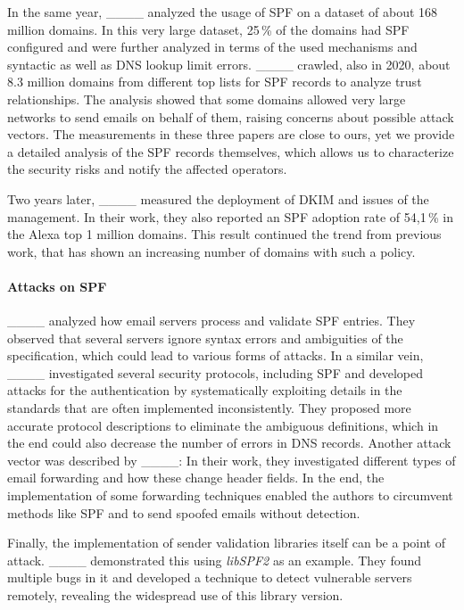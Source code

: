 In the same year, \mbox{____} analyzed the usage of \ac{SPF} on a dataset of about 168 million domains. In this very large dataset, 25\,\% of the domains had \ac{SPF} configured and were further analyzed in terms of the used mechanisms and syntactic as well as DNS lookup limit errors.
____ crawled, also in 2020, about 8.3 million domains from different top lists for SPF records to analyze trust relationships.
The analysis showed that some domains allowed very large networks to send emails on behalf of them, raising concerns about possible attack vectors.
The measurements in these three papers are close to ours, yet we provide a detailed analysis of the \ac{SPF} records themselves, which allows us to characterize the security risks and notify the affected operators.

Two years later, ____ measured the deployment of \ac{DKIM} and issues of the management.
In their work, they also reported an \ac{SPF} adoption rate of 54,1\,\% in the Alexa top 1 million domains.
This result continued the trend from previous work, that has shown an increasing number of domains with such a policy.



\paragraph{Attacks on SPF}
____ analyzed how email servers process and validate \ac{SPF} entries. They observed that several servers ignore syntax errors and ambiguities of the specification, which could lead to various forms of attacks.
In a similar vein, ____ investigated several security protocols, including SPF and developed attacks for the authentication by systematically exploiting details in the standards that are often implemented inconsistently.
They proposed more accurate protocol descriptions to eliminate the ambiguous definitions, which in the end could also decrease the number of errors in DNS records.
Another attack vector was described by ____:
In their work, they investigated different types of email forwarding and how these change header fields.
In the end, the implementation of some forwarding techniques enabled the authors to circumvent methods like \ac{SPF} and to send spoofed emails without detection.

Finally, the implementation of sender validation libraries itself can be a point of attack.
____ demonstrated this using \textit{libSPF2} as an example.
They found multiple bugs in it and developed a technique to detect vulnerable servers remotely, revealing the widespread use of this library version.

